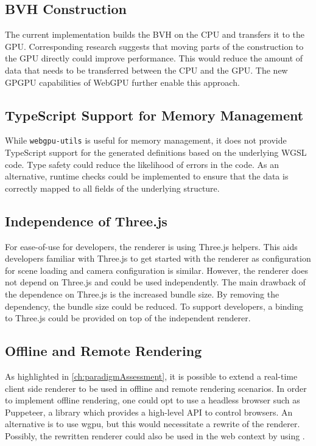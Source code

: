 \subsection*{BVH Construction}

The current implementation builds the \gls{BVH} on the \gls{CPU} and transfers it to the \gls{GPU}. Corresponding research \cite{lauterbach2009GPUbvh} suggests that moving parts of the construction to the \gls{GPU} directly could improve performance. This would reduce the amount of data that needs to be transferred between the \gls{CPU} and the \gls{GPU}. The new \gls{GPGPU} capabilities of WebGPU further enable this approach.

\subsection*{TypeScript Support for Memory Management}

While \texttt{webgpu-utils} \cite{webgpuUtilsLib} is useful for memory management, it does not provide TypeScript support for the generated definitions based on the underlying \gls{WGSL} code. Type safety could reduce the likelihood of errors in the code. As an alternative, runtime checks could be implemented to ensure that the data is correctly mapped to all fields of the underlying structure.

\subsection*{Independence of Three.js}

For ease-of-use for developers, the renderer is using \gls{Three.js} helpers. This aids developers familiar with \gls{Three.js} to get started with the renderer as configuration for scene loading and camera configuration is similar. However, the renderer does not depend on \gls{Three.js} and could be used independently. The main drawback of the dependence on \gls{Three.js} is the increased bundle size. By removing the dependency, the bundle size could be reduced. To support developers, a binding to \gls{Three.js} could be provided on top of the independent renderer.

\subsection*{Offline and Remote Rendering}

As highlighted in \autoref{ch:paradigmAssessment}, it is possible to extend a real-time client side renderer to be used in offline and remote rendering scenarios. In order to implement offline rendering, one could opt to use a headless browser such as Puppeteer, a  library which provides a high-level \gls{API} to control browsers. An alternative is to use \gls{wgpu}, but this would necessitate a rewrite of the renderer. Possibly, the rewritten renderer could also be used in the web context by using .

